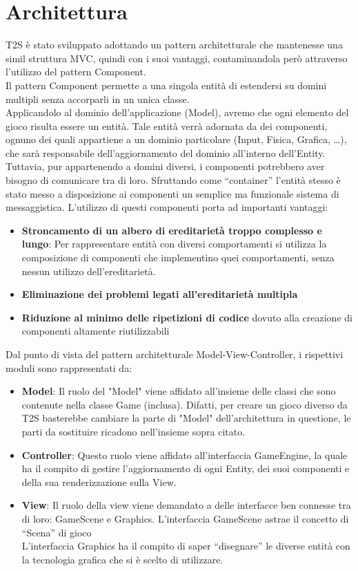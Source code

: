 \documentclass[a4paper,12pt]{report}
\begin{document}
\section{Architettura}
T2S è stato sviluppato adottando un pattern architetturale che mantenesse una simil struttura MVC, quindi con i suoi vantaggi, contaminandola però attraverso l’utilizzo del pattern Component.
\\
Il pattern Component permette a una singola entità di estendersi su domini multipli senza accorparli in un unica classe.
\\
Applicandolo al dominio dell’applicazione (Model), avremo che ogni elemento del gioco risulta essere un entità.
Tale entità verrà adornata da dei componenti, ognuno dei quali appartiene a un dominio particolare (Input, Fisica, Grafica, …), che sarà responsabile dell’aggiornamento del dominio all’interno dell’Entity.
Tuttavia, pur appartenendo a domini diversi, i componenti potrebbero aver bisogno di comunicare tra di loro.
Sfruttando come “container” l'entità stesso è stato messo a disposizione ai componenti un semplice ma funzionale sistema di messaggistica.
L’utilizzo di questi componenti porta ad importanti vantaggi:
\begin{itemize}
	\item \textbf{Stroncamento di un albero di ereditarietà troppo complesso e lungo}:
	Per rappresentare entità con diversi comportamenti si utilizza la composizione di componenti che implementino quei comportamenti, senza nessun utilizzo dell’ereditarietà.
	\item \textbf{Eliminazione dei problemi legati all’ereditarietà multipla}
	\item \textbf{Riduzione al minimo delle ripetizioni di codice} dovuto alla creazione di componenti altamente riutilizzabili
\end{itemize}
Dal punto di vista del pattern architetturale Model-View-Controller, i rispettivi moduli sono rappresentati da:
\begin{itemize}
	\item \textbf{Model}:
	Il ruolo del "Model" viene affidato all'insieme delle classi che sono contenute nella classe Game (inclusa).
	Difatti, per creare un gioco diverso da T2S basterebbe cambiare la parte di "Model" dell'architettura in questione, le parti da sostituire ricadono nell'insieme sopra citato.
	\item \textbf{Controller}:
	Questo ruolo viene affidato all’interfaccia GameEngine, la quale ha il compito di gestire l’aggiornamento di ogni Entity, dei suoi componenti e della sua renderizzazione sulla View.
	\item \textbf{View}:
	Il ruolo della view viene demandato a delle interfacce ben connesse tra di loro: GameScene e Graphics.
	L’interfaccia GameScene astrae il concetto di “Scena” di gioco
	\\L’interfaccia Graphics ha il compito di saper “disegnare” le diverse entità con la 
	tecnologia grafica che si è scelto di utilizzare.
\end{itemize}
\end{document}
